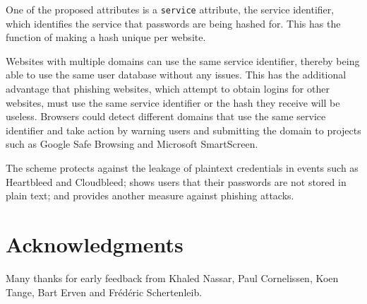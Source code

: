 \documentclass{paper}
\newcommand{\code}[1]{\texttt{\colorbox{gray!11}{#1}}}
\begin{document}
One of the proposed attributes is a \code{service} attribute, the service identifier, which
identifies the service that passwords are being hashed for. This has the function of making a
hash unique per website.

Websites with multiple domains can use the same service identifier, thereby being able to use
the same user database without any issues. This has the additional advantage that phishing
websites, which attempt to obtain logins for other websites, must use the same service
identifier or the hash they receive will be useless. Browsers could detect different domains
that use the same service identifier and take action by warning users and submitting the
domain to projects such as Google Safe Browsing and Microsoft SmartScreen.

The scheme protects against the leakage of plaintext credentials in events such as Heartbleed
and Cloudbleed; shows users that their passwords are not stored in plain text; and provides
another measure against phishing attacks.

\section*{Acknowledgments}

Many thanks for early feedback from Khaled Nassar, Paul Cornelissen, Koen Tange, Bart Erven
and Fr\'ed\'eric Schertenleib.
\end{document}
